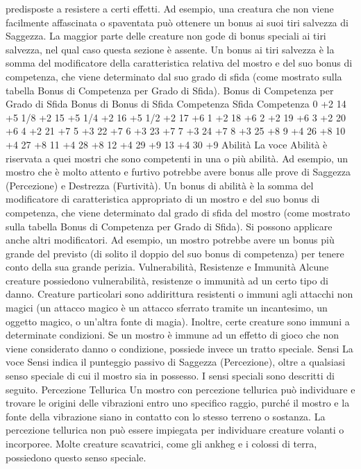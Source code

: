 \begin{multicols}{2}
predisposte a resistere a certi effetti. Ad esempio, una
creatura che non viene facilmente affascinata o
spaventata può ottenere un bonus ai suoi tiri salvezza
di Saggezza. La maggior parte delle creature non gode
di bonus speciali ai tiri salvezza, nel qual caso questa
sezione è assente.
Un bonus ai tiri salvezza è la somma del modificatore
della caratteristica relativa del mostro e del suo bonus
di competenza, che viene determinato dal suo grado di
sfida (come mostrato sulla tabella Bonus di
Competenza per Grado di Sfida).
Bonus di Competenza per Grado di Sfida
Bonus di Bonus di
Sfida Competenza Sfida Competenza
0 +2 14 +5
1/8 +2 15 +5
1/4 +2 16 +5
1/2 +2 17 +6
1 +2 18 +6
2 +2 19 +6
3 +2 20 +6
4 +2 21 +7
5 +3 22 +7
6 +3 23 +7
7 +3 24 +7
8 +3 25 +8
9 +4 26 +8
10 +4 27 +8
11 +4 28 +8
12 +4 29 +9
13 +4 30 +9
Abilità
La voce Abilità è riservata a quei mostri che sono
competenti in una o più abilità. Ad esempio, un mostro
che è molto attento e furtivo potrebbe avere bonus alle
prove di Saggezza (Percezione) e Destrezza (Furtività).
Un bonus di abilità è la somma del modificatore di
caratteristica appropriato di un mostro e del suo bonus
di competenza, che viene determinato dal grado di
sfida del mostro (come mostrato sulla tabella Bonus di
Competenza per Grado di Sfida). Si possono applicare
anche altri modificatori. Ad esempio, un mostro
potrebbe avere un bonus più grande del previsto (di
solito il doppio del suo bonus di competenza) per
tenere conto della sua grande perizia.
Vulnerabilità, Resistenze e
Immunità
Alcune creature possiedono vulnerabilità, resistenze o
immunità ad un certo tipo di danno. Creature particolari
sono addirittura resistenti o immuni agli attacchi non
magici (un attacco magico è un attacco sferrato tramite
un incantesimo, un oggetto magico, o un’altra fonte di
magia). Inoltre, certe creature sono immuni a
determinate condizioni. Se un mostro è immune ad un
effetto di gioco che non viene considerato danno o
condizione, possiede invece un tratto speciale.
Sensi
La voce Sensi indica il punteggio passivo di Saggezza
(Percezione), oltre a qualsiasi senso speciale di cui il
mostro sia in possesso. I sensi speciali sono descritti di
seguito.
Percezione Tellurica
Un mostro con percezione tellurica può individuare e
trovare le origini delle vibrazioni entro uno specifico
raggio, purché il mostro e la fonte della vibrazione siano
in contatto con lo stesso terreno o sostanza. La
percezione tellurica non può essere impiegata per
individuare creature volanti o incorporee. Molte creature
scavatrici, come gli ankheg e i colossi di terra,
possiedono questo senso speciale.

\end{multicols}
